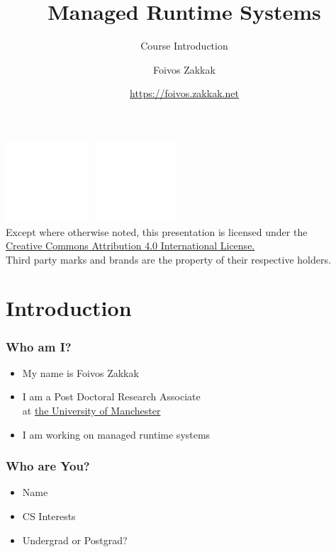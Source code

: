 \documentclass[
14pt,
aspectratio=169,
usenames,
dvipsnames,
x11names]{beamer}
\title{Managed Runtime Systems}
\subtitle{Course Introduction}
\author[\url{https://foivos.zakkak.net}]{Foivos Zakkak}
\date{\url{https://foivos.zakkak.net}}
\begin{document}


\begin{frame}[plain]
  \titlepage
  \centering
  \includegraphics[height=.75cm]{cc}~
  \includegraphics[height=.75cm]{by}\\[1em]
  \scriptsize{Except where otherwise noted, this presentation is licensed under the\\
    \href{http://creativecommons.org/licenses/by/4.0/}%
    {Creative Commons Attribution 4.0 International License.}\\[1ex]
    Third party marks and brands are the property of their respective
    holders.}
\end{frame}


\section{Introduction}

\begin{frame}
  \frametitle{Who am I?}
  \begin{itemize} \setlength{\itemsep}{\fill}
  \item My name is \alert{Foivos Zakkak}
  \item I am a Post Doctoral Research Associate\\
    at \href{http://www.manchester.ac.uk/}{\alert{the University of Manchester}}
  \item I am working on managed runtime systems
  \end{itemize}
\end{frame}

\begin{frame}
  \frametitle{Who are You?}
  \begin{itemize} \setlength{\itemsep}{\fill}
  \item Name
  \item CS Interests
  \item Undergrad or Postgrad?
  \end{itemize}
\end{frame}
\end{document}
